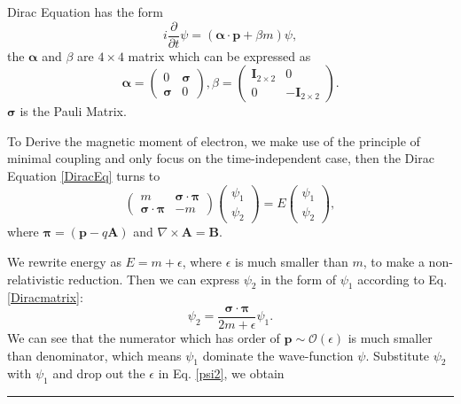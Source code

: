 \documentclass[12pt]{report}
\numberwithin{problemname}{chapter}
\newenvironment{solution}{\vspace{1em}\par\noindent{\large\textbf{\textsc{Solution}}}\par}{\vspace{1em}\hrule}
\begin{document}
\begin{solution}
Dirac Equation has the form
\begin{equation}
    i\frac{\partial}{\partial t}\psi=(\bm{\alpha}\cdot\mathbf{p}+\beta m)\psi,\label{DiracEq}
\end{equation}
the $\bm{\alpha}$ and $\beta$ are $4\times4$ matrix which can be expressed as
\begin{equation}
    \bm{\alpha}=
    \begin{pmatrix}
        0 & \bm{\sigma} \\
        \bm{\sigma} & 0
    \end{pmatrix},
    \beta=
    \begin{pmatrix}
        \mathbf{I}_{2\times2} & 0 \\
        0 & -\mathbf{I}_{2\times2}
    \end{pmatrix}.
\end{equation}
$\bm{\sigma}$ is the Pauli Matrix.
\par
To Derive the magnetic moment of electron, we make use of the principle of minimal coupling and only focus on the time-independent case, then the Dirac Equation \eqref{DiracEq} turns to
\begin{equation}
    \begin{pmatrix}
        m & \bm{\sigma}\cdot\bm{\pi} \\
        \bm{\sigma}\cdot\bm{\pi} & -m
    \end{pmatrix}
    \begin{pmatrix}
        \psi_1 \\
        \psi_2
    \end{pmatrix}
    =E
    \begin{pmatrix}
        \psi_1 \\
        \psi_2
    \end{pmatrix},\label{Diracmatrix}
\end{equation}
where $\bm{\pi}=(\mathbf{p}-q\mathbf{A})$ and $\nabla\times\mathbf{A}=\mathbf{B}$.
\par
We rewrite energy as $E=m+\epsilon$, where $\epsilon$ is much smaller than $m$, to make a non-relativistic reduction. Then we can express $\psi_2$ in the form of $\psi_1$ according to Eq. \eqref{Diracmatrix}:
\begin{equation}
    \psi_2=\frac{\bm{\sigma}\cdot\bm{\pi}}{2m+\epsilon}\psi_1.\label{psi2}
\end{equation}
We can see that the numerator which has order of $\mathbf{p}\sim\mathcal{O}(\epsilon)$ is much smaller than denominator, which means $\psi_1$ dominate the wave-function $\psi$. Substitute $\psi_2$ with $\psi_1$ and drop out the $\epsilon$ in Eq. \eqref{psi2}, we obtain

\end{solution}
\end{document}
